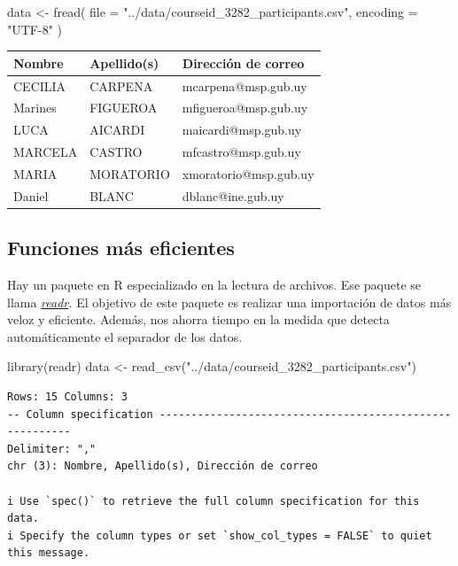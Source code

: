 \documentclass[
  letterpaper,
  DIV=11,
  numbers=noendperiod]{scrreprt}
\newenvironment{Shaded}{\begin{snugshade}}{\end{snugshade}}
\newcommand{\AttributeTok}[1]{\textcolor[rgb]{0.40,0.45,0.13}{#1}}
\newcommand{\FunctionTok}[1]{\textcolor[rgb]{0.28,0.35,0.67}{#1}}
\newcommand{\NormalTok}[1]{\textcolor[rgb]{0.00,0.23,0.31}{#1}}
\newcommand{\OtherTok}[1]{\textcolor[rgb]{0.00,0.23,0.31}{#1}}
\newcommand{\StringTok}[1]{\textcolor[rgb]{0.13,0.47,0.30}{#1}}
\begin{document}
\begin{Shaded}
\begin{Highlighting}[]
\NormalTok{data }\OtherTok{\textless{}{-}} \FunctionTok{fread}\NormalTok{(}
  \AttributeTok{file =} \StringTok{"../data/courseid\_3282\_participants.csv"}\NormalTok{,}
  \AttributeTok{encoding =} \StringTok{"UTF{-}8"}
\NormalTok{)}
\end{Highlighting}
\end{Shaded}

\begin{longtable}[]{@{}lll@{}}
\toprule()
Nombre & Apellido(s) & Dirección de correo \\
\midrule()
\endhead
CECILIA & CARPENA & mcarpena@msp.gub.uy \\
Marines & FIGUEROA & mfigueroa@msp.gub.uy \\
LUCA & AICARDI & maicardi@msp.gub.uy \\
MARCELA & CASTRO & mfcastro@msp.gub.uy \\
MARIA & MORATORIO & xmoratorio@msp.gub.uy \\
Daniel & BLANC & dblanc@ine.gub.uy \\
\bottomrule()
\end{longtable}

\hypertarget{funciones-muxe1s-eficientes}{%
\subsection{Funciones más
eficientes}\label{funciones-muxe1s-eficientes}}

Hay un paquete en R especializado en la lectura de archivos. Ese paquete
se llama
\href{https://www.rdocumentation.org/packages/readr/versions/2.1.2}{\emph{readr}}\emph{.}
El objetivo de este paquete es realizar una importación de datos más
veloz y eficiente. Además, nos ahorra tiempo en la medida que detecta
automáticamente el separador de los datos.

\begin{Shaded}
\begin{Highlighting}[]
\FunctionTok{library}\NormalTok{(readr)}
\NormalTok{data }\OtherTok{\textless{}{-}} \FunctionTok{read\_csv}\NormalTok{(}\StringTok{"../data/courseid\_3282\_participants.csv"}\NormalTok{)}
\end{Highlighting}
\end{Shaded}

\begin{verbatim}
Rows: 15 Columns: 3
-- Column specification --------------------------------------------------------
Delimiter: ","
chr (3): Nombre, Apellido(s), Dirección de correo

i Use `spec()` to retrieve the full column specification for this data.
i Specify the column types or set `show_col_types = FALSE` to quiet this message.
\end{verbatim}
\end{document}
